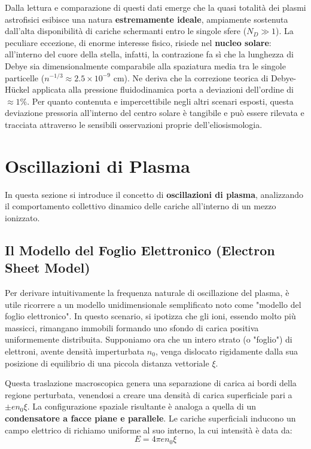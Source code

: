 Dalla lettura e comparazione di questi dati emerge che la quasi totalità dei plasmi astrofisici esibisce una natura \textbf{estremamente ideale}, ampiamente sostenuta dall'alta disponibilità di cariche schermanti entro le singole sfere ($N_D \gg 1$).
La peculiare eccezione, di enorme interesse fisico, risiede nel \textbf{nucleo solare}: all'interno del cuore della stella, infatti, la contrazione fa sì che la lunghezza di Debye sia dimensionalmente comparabile alla spaziatura media tra le singole particelle ($n^{-1/3} \approx 2.5 \times 10^{-9} \text{ cm}$). Ne deriva che la correzione teorica di Debye-Hückel applicata alla pressione fluidodinamica porta a deviazioni dell'ordine di $\approx 1\%$. Per quanto contenuta e impercettibile negli altri scenari esposti, questa deviazione pressoria all'interno del centro solare è tangibile e può essere rilevata e tracciata attraverso le sensibili osservazioni proprie dell'eliosismologia.

\section{Oscillazioni di Plasma}

In questa sezione si introduce il concetto di \textbf{oscillazioni di plasma}, analizzando il comportamento collettivo dinamico delle cariche all'interno di un mezzo ionizzato.

\subsection{Il Modello del Foglio Elettronico (Electron Sheet Model)}
Per derivare intuitivamente la frequenza naturale di oscillazione del plasma, è utile ricorrere a un modello unidimensionale semplificato noto come "modello del foglio elettronico". In questo scenario, si ipotizza che gli ioni, essendo molto più massicci, rimangano immobili formando uno sfondo di carica positiva uniformemente distribuita. Supponiamo ora che un intero strato (o "foglio") di elettroni, avente densità imperturbata $n_0$, venga dislocato rigidamente dalla sua posizione di equilibrio di una piccola distanza vettoriale $\xi$.

Questa traslazione macroscopica genera una separazione di carica ai bordi della regione perturbata, venendosi a creare una densità di carica superficiale pari a $\pm e n_0 \xi$. La configurazione spaziale risultante è analoga a quella di un \textbf{condensatore a facce piane e parallele}. Le cariche superficiali inducono un campo elettrico di richiamo uniforme al suo interno, la cui intensità è data da:
\begin{equation}
E = 4\pi e n_0 \xi
\end{equation}

